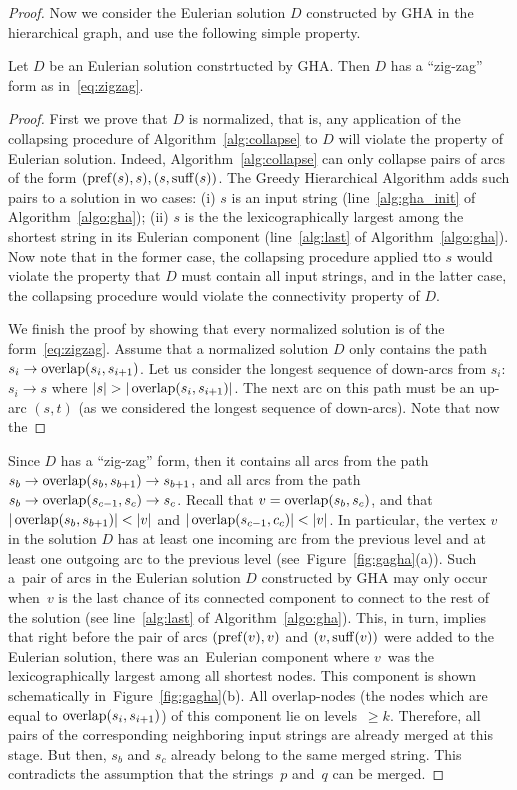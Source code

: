 \begin{proof}
Now we consider the Eulerian solution $D$ constructed by GHA in the hierarchical graph, and use the following simple property.
\begin{claim}
Let $D$ be an Eulerian solution constrtucted by GHA. Then $D$ has a ``zig-zag'' form as in~\eqref{eq:zigzag}. 
\end{claim}
\begin{proof}
First we prove that $D$ is normalized, that is, any application of the collapsing procedure of Algorithm~\ref{alg:collapse} to $D$ will violate the property of Eulerian solution. Indeed, Algorithm~\ref{alg:collapse} can only collapse pairs of arcs of the form $(\operatorname{pref}(s), s), (s, \operatorname{suff}(s))$. The Greedy Hierarchical Algorithm adds such pairs to a solution in wo cases: (i) $s$ is an input string (line~\ref{alg:gha_init} of Algorithm~\ref{algo:gha}); (ii) $s$ is the the lexicographically largest among the shortest string in its Eulerian component (line~\ref{alg:last} of Algorithm~\ref{algo:gha}). Now note that in the former case, the collapsing procedure applied tto $s$ would violate the property that $D$ must contain all input strings, and in the latter case, the collapsing procedure would violate the connectivity property of $D$.

We finish the proof by showing that every normalized solution is of the form~\eqref{eq:zigzag}. Assume that a normalized solution $D$ only contains the path $s_i \to \operatorname{overlap}(s_i,s_{i+1})$. Let us consider the longest sequence of down-arcs from $s_i$: $s_i \to s$ where $|s|>|\overlap(s_i,s_{i+1})|$. The next arc on this path must be an up-arc $(s, t)$ (as we considered the longest sequence of down-arcs). Note that now the 
\end{proof}

Since $D$ has a ``zig-zag'' form, then it contains all arcs from the path $s_b\to\operatorname{overlap}(s_{b}, s_{b+1}) \to s_{b+1}$, and all arcs from the path $s_b\to\operatorname{overlap}(s_{c-1}, s_{c}) \to s_{c}$. Recall that $v=\operatorname{overlap}(s_b,s_c)$, and that $|\overlap(s_b,s_{b+1})| <|v|$ and $|\operatorname{overlap}(s_{c-1},c_c)|< |v|$. In particular, the vertex $v$ in the solution $D$ has at least one incoming arc from the previous level and at least one outgoing arc to the previous level (see~Figure~\ref{fig:gagha}(a)). Such a~pair of arcs in the Eulerian solution $D$ constructed by GHA may only occur when~$v$ is the last chance of
its connected component to connect to the rest of the solution (see line~\ref{alg:last} of Algorithm~\ref{algo:gha}). This, in turn, implies that right before the pair of arcs $(\operatorname{pref}(v), v)$ and $(v, \operatorname{suff}(v))$ were added to the Eulerian solution, there was an~Eulerian component where $v$~was the lexicographically largest among all shortest nodes. This component is shown schematically in~Figure~\ref{fig:gagha}(b). All overlap-nodes (the nodes which are equal to $\operatorname{overlap}(s_i,s_{i+1})$) of this component lie on levels~$\geq k$. Therefore, all pairs of the corresponding neighboring input strings are already merged at this stage. But then, $s_b$ and
$s_c$ already belong to the same merged string. This contradicts the assumption that the strings~$p$ and~$q$ can be merged.


\end{proof}
